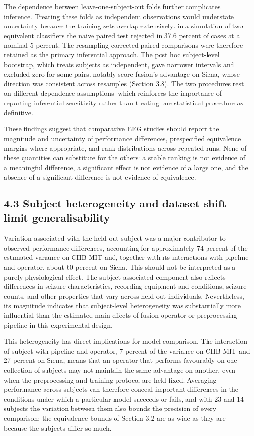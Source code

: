 \documentclass[11pt,a4paper]{article}
\begin{document}
The dependence between leave-one-subject-out folds further complicates inference.
Treating these folds as independent observations would understate uncertainty because
the training sets overlap extensively: in a simulation of two equivalent classifiers the
naive paired test rejected in 37.6 percent of cases at a nominal 5 percent. The
resampling-corrected paired comparisons were therefore retained as the primary
inferential approach. The post hoc subject-level bootstrap, which treats subjects as
independent, gave narrower intervals and excluded zero for some pairs, notably score
fusion's advantage on Siena, whose direction was consistent across resamples
(Section 3.8). The two procedures rest on different dependence assumptions, which
reinforces the importance of reporting inferential sensitivity rather than treating one
statistical procedure as definitive.

These findings suggest that comparative EEG studies should report the magnitude and
uncertainty of performance differences, prespecified equivalence margins where
appropriate, and rank distributions across repeated runs. None of these quantities can
substitute for the others: a stable ranking is not evidence of a meaningful difference, a
significant effect is not evidence of a large one, and the absence of a significant
difference is not evidence of equivalence.

\subsection{4.3 Subject heterogeneity and dataset shift limit generalisability}\label{subject-heterogeneity-and-dataset-shift-limit-generalisability}

Variation associated with the held-out subject was a major contributor to observed
performance differences, accounting for approximately 74 percent of the estimated
variance on CHB-MIT and, together with its interactions with pipeline and operator,
about 60 percent on Siena. This should not be interpreted as a purely physiological
effect. The subject-associated component also reflects differences in seizure
characteristics, recording equipment and conditions, seizure counts, and other
properties that vary across held-out individuals. Nevertheless, its magnitude indicates
that subject-level heterogeneity was substantially more influential than the estimated
main effects of fusion operator or preprocessing pipeline in this experimental design.

This heterogeneity has direct implications for model comparison. The interaction of
subject with pipeline and operator, 7 percent of the variance on CHB-MIT and 27 percent on
Siena, means that an operator that performs favourably on one collection of subjects may
not maintain the same advantage on another, even when the preprocessing and training
protocol are held fixed. Averaging performance across subjects can therefore conceal
important differences in the conditions under which a particular model succeeds or
fails, and with 23 and 14 subjects the variation between them also bounds the precision
of every comparison: the equivalence bounds of Section 3.2 are as wide as they are
because the subjects differ so much.
\end{document}
